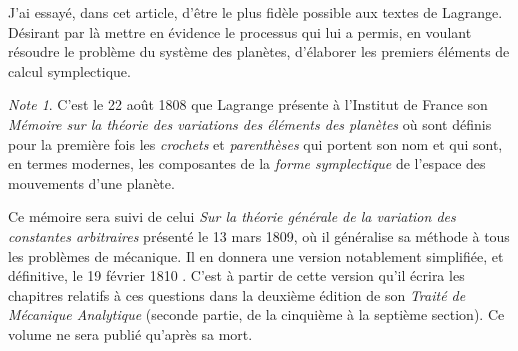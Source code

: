 \documentclass[12pt,paperletter, reqno]{amsart}
\theoremstyle{plain}
\theoremstyle{remark}
\newtheorem*{note}{Note}
\begin{document}
  J'ai essayé,
  dans cet article,
  d'être le plus fidèle possible aux textes de Lagrange.
  Désirant par là mettre en évidence le processus qui lui a permis,
  en voulant résoudre le problème du système des planètes,
  d'élaborer les premiers éléments de calcul symplectique.
  
  \begin{note}
    C'est le 22 août 1808 que Lagrange présente à l'Institut de France son \emph{Mémoire sur la théorie des variations des éléments des planètes} \cite{Lagrange2} où sont définis pour la première fois les \emph{crochets} et \emph{parenthèses} qui portent son nom et qui sont,
    en termes modernes,
    les composantes de la \emph{forme symplectique} de l'espace des mouvements d'une planète.
    
    Ce mémoire sera suivi de celui \emph{Sur la théorie générale de la variation des constantes arbitraires} \cite{Lagrange3} présenté le 13 mars 1809,
    où il généralise sa méthode à tous les problèmes de mécanique.
    Il en donnera une version notablement simplifiée,
    et définitive,
    le 19 février 1810 \cite{Lagrange4}.
    C'est à partir de cette version qu'il écrira les chapitres relatifs à ces questions dans la deuxième édition de son \emph{Traité de Mécanique Analytique} \cite{Lagrange1} (seconde partie, de la cinquième à la septième section).
    Ce volume ne sera publié qu'après sa mort.
  \end{note}
  
\end{document}
